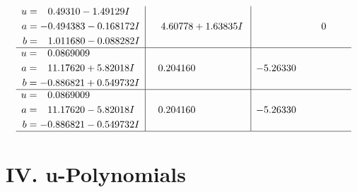 \documentclass[1p]{elsarticle_modified}
\theoremstyle{definition}
\begin{document}
$$\begin{array}{c|c|c}
\begin{aligned}
u &= \phantom{-}0.49310 - 1.49129 I \\
a &= -0.494383 - 0.168172 I \\
b &= \phantom{-}1.011680 - 0.088282 I\end{aligned}
 & \phantom{-}4.60778 + 1.63835 I & \phantom{-0.000000 } 0 \\ \hline\begin{aligned}
u &= \phantom{-}0.0869009\phantom{ +0.000000I} \\
a &= \phantom{-}11.17620 + 5.82018 I \\
b &= -0.886821 + 0.549732 I\end{aligned}
 & \phantom{-}0.204160\phantom{ +0.000000I} & -5.26330\phantom{ +0.000000I} \\ \hline\begin{aligned}
u &= \phantom{-}0.0869009\phantom{ +0.000000I} \\
a &= \phantom{-}11.17620 - 5.82018 I \\
b &= -0.886821 - 0.549732 I\end{aligned}
 & \phantom{-}0.204160\phantom{ +0.000000I} & -5.26330\phantom{ +0.000000I}\\
 \hline 
 \end{array}$$\newpage
\newpage\renewcommand{\arraystretch}{1}
\centering \section*{ IV. u-Polynomials}
\end{document}
